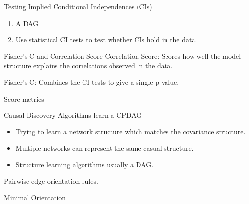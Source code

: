 \documentclass{beamer}
\begin{document}
\begin{frame}{Testing Implied Conditional Independences (CIs)}
	\begin{enumerate}
		\item A DAG 
		\item Use statistical CI tests to test whether CIs hold in the data.
	\end{enumerate}
\end{frame}

\begin{frame}{Fisher's C and Correlation Score}
	Correlation Score: Scores how well the model structure explains the correlations 
	observed in the data.

	Fisher's C: Combines the CI tests to give a single p-value.
\end{frame}

\begin{frame}{Score metrics}
\end{frame}

\begin{frame}{Causal Discovery Algorithms learn a CPDAG}
	\begin{figure}
	\end{figure}
	
	\begin{itemize}
		\item Trying to learn a network structure which matches the covariance
			structure.
		\item Multiple networks can represent the same casual structure.
		\item Structure learning algorithms usually a DAG.
	\end{itemize}

	Pairwise edge orientation rules.
\end{frame}

\begin{frame}{Minimal Orientation}
\end{frame}
\end{document}

